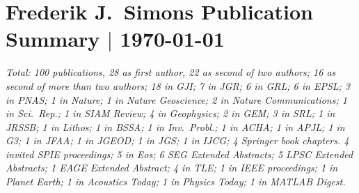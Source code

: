 \documentclass[12pt]{article}
\begin{document}
\section{Frederik J.~Simons Publication Summary $|$ \today}

\emph{Total: 100 publications,
28 as first author,
22 as second of two authors;
16 as second of more than two authors;
18 in \emph{GJI};
7 in \emph{JGR};
6 in \emph{GRL};
6 in \emph{EPSL};
3 in \emph{PNAS};
1 in \emph{Nature};
1 in \emph{Nature Geoscience};
2 in \emph{Nature Communications};
1 in \emph{Sci.~Rep.};
1 in \emph{SIAM Review};
4 in \emph{Geophysics};
2 in \emph{GEM};
3 in \emph{SRL};
1 in \emph{JRSSB};
1 in \emph{Lithos};
1 in \emph{BSSA};
1 in \emph{Inv.~Probl.};
1 in \emph{ACHA};
1 in \emph{APJL};
1 in \emph{G3};
1 in \emph{JFAA};
1 in \emph{JGEOD};
1 in \emph{JGS};
1 in \emph{IJCG};
4 \emph{Springer} book chapters.
4 invited \emph{SPIE} proceedings;
5 in \emph{Eos};
6 \emph{SEG Extended Abstracts};
5 \emph{LPSC Extended Abstracts};
1 \emph{EAGE Extended Abstract};
4 in \emph{TLE};
1 in \emph{IEEE} proceedings;
1 in \emph{Planet Earth};
1 in \emph{Acoustics Today};
1 in \emph{Physics Today};
1 in \emph{MATLAB Digest}.}

\nocite{Bevis+2019,Dahlen+2008,Guillaumin+2022,Gualtieri+2020,Harig+2012,Harig+2015a,Kopp+2009,Nolet+2019,Pipatprathanporn+2022,Plattner+2014a,Plattner+2017a,Reuber+2020,Simon+2022,Simons+99,Simons+2003a,Simons+2006a,Simons+2006b,Simons+2009a,Simons+2011b,Simons+2013,Simons2010,Sukhovich+2015,Wang+2012a,Yuan+2014a,Yuan+2015}



\end{document}
